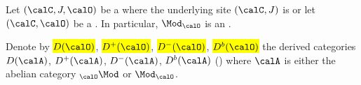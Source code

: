 \begin{notation} \label{notation:derived_categories_of_O_modules_on_an_essentially_small_site_ringed_site}
    Let $(\calC, J, \calO)$ be a  where the underlying site $(\calC, J)$ is  or let $(\calC, \calO)$ be a . In particular, $\Mod_\calO$ is an .
    
    Denote by \hl{$D(\calO)$}, \hl{$D^+(\calO)$}, \hl{$D^-(\calO)$}, \hl{$D^b(\calO)$} the derived categories $D(\calA)$, $D^+(\calA)$, $D^-(\calA)$, $D^b(\calA)$ () where $\calA$ is either the abelian category $_{\calO} \Mod$ or $\Mod_{\calO}$.
\end{notation}
